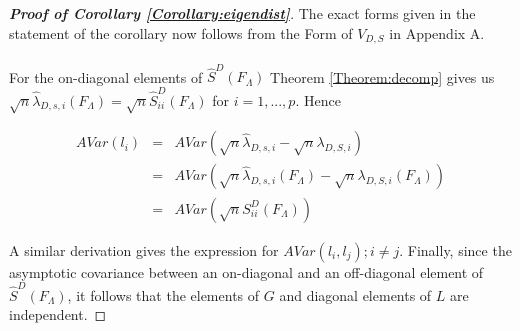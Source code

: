 \documentclass[fleqn,11pt]{article}
\begin{document}
\begin{proof}[\textbf{Proof of Corollary \ref{Corollary:eigendist}}]
The exact forms given in the statement of the corollary now follows from the  Form of $V_{D,S}$ in Appendix A.

\paragraph{}For the on-diagonal elements of $\hat S^D(F_\Lambda)$ Theorem \ref{Theorem:decomp} gives us $ \sqrt n \hat\lambda_{D,s,i} (F_\Lambda) = \sqrt n \hat S^D_{ii}(F_\Lambda)$ for $i = 1,...,p$. Hence

\begin{eqnarray*}
AVar(l_i) &=& AVar(\sqrt n \hat\lambda_{D,s,i} - \sqrt n \lambda_{D,S,i})\\
&=& AVar(\sqrt n \hat\lambda_{D,s,i} (F_\Lambda) - \sqrt n \lambda_{D,S,i}(F_\Lambda))\\
&=& AVar(\sqrt n S^D_{ii}(F_\Lambda))
\end{eqnarray*}

A similar derivation gives the expression for $AVar(l_i,l_j); i \neq j$. Finally, since the asymptotic covariance between an on-diagonal and an off-diagonal element of $\hat S^D(F_\Lambda)$, it follows that the elements of $G$ and diagonal elements of $L$ are independent.
\end{proof}



\end{document}
